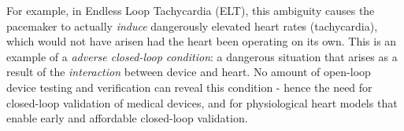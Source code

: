 For example, in Endless Loop Tachycardia (ELT), this ambiguity causes the pacemaker to actually \emph{induce} dangerously elevated heart rates (tachycardia), which would not have arisen had the heart been operating on its own.
This is an example of a \emph{adverse closed-loop condition}: a dangerous situation that arises as a result of the \emph{interaction} between device and heart.
No amount of open-loop device testing and verification can reveal this condition - hence the need for closed-loop validation of medical devices, and for physiological heart models that enable early and affordable closed-loop validation.
